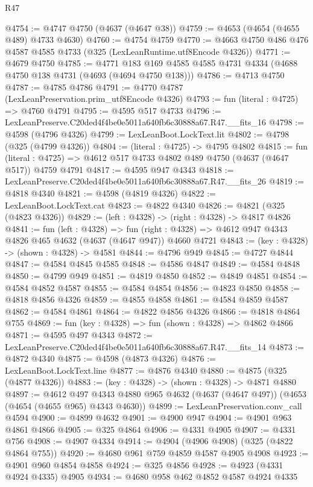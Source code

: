 \begin{lexlean}{R47}
\begin{coremodule}
@4754 := @4747 @4750 (@4637 (@4647 @38))
@4759 := @4653 (@4654 (@4655 @489) @4733 @4630)
@4760 := @4754 @4759
@4770 := @4663 @4750 @486 @476 @4587 @4585 @4733 (@325 (LexLeanRuntime.utf8Encode @4326))
@4771 := @4679 @4750
@4785 := @4771 @183 @169 @4585 @4585 @4731 @4334 (@4688 @4750 @138 @4731 (@4693 (@4694 @4750 @138)))
@4786 := @4713 @4750
@4787 := @4785 @4786
@4791 := @4770 @4787 (LexLeanPreservation.prim_utf8Encode @4326)
@4793 := fun (literal : @4725) => @4760 @4791
@4795 := @4595 @517 @4733
@4796 := LexLeanPreserve.C20ded4f4be0e5011a640fb6c30888a67.R47.__fits_16
@4798 := @4598 (@4796 @4326)
@4799 := LexLeanBoot.LockText.lit
@4802 := @4798 (@325 (@4799 @4326))
@4804 := (literal : @4725) -> @4795 @4802
@4815 := fun (literal : @4725) => @4612 @517 @4733 @4802 @489 @4750 (@4637 (@4647 @517)) @4759 @4791
@4817 := @4595 @947 @4343
@4818 := LexLeanPreserve.C20ded4f4be0e5011a640fb6c30888a67.R47.__fits_26
@4819 := @4818 @4340
@4821 := @4598 (@4819 @4326)
@4822 := LexLeanBoot.LockText.cat
@4823 := @4822 @4340
@4826 := @4821 (@325 (@4823 @4326))
@4829 := (left : @4328) -> (right : @4328) -> @4817 @4826
@4841 := fun (left : @4328) =>
  fun (right : @4328) => @4612 @947 @4343 @4826 @465 @4632 (@4637 (@4647 @947)) @4660 @4721
@4843 := (key : @4328) -> (shown : @4328) -> @4581
@4844 := @4796 @949
@4845 := @4727 @4844
@4847 := @4584 @4845 @4585
@4848 := @4586 @4847
@4849 := @4584 @4848
@4850 := @4799 @949
@4851 := @4819 @4850
@4852 := @4849 @4851
@4854 := @4584 @4852 @4587
@4855 := @4584 @4854
@4856 := @4823 @4850
@4858 := @4818 @4856 @4326
@4859 := @4855 @4858
@4861 := @4584 @4859 @4587
@4862 := @4584 @4861
@4864 := @4822 @4856 @4326
@4866 := @4818 @4864 @755
@4869 := fun (key : @4328) => fun (shown : @4328) => @4862 @4866
@4871 := @4595 @497 @4343
@4872 := LexLeanPreserve.C20ded4f4be0e5011a640fb6c30888a67.R47.__fits_14
@4873 := @4872 @4340
@4875 := @4598 (@4873 @4326)
@4876 := LexLeanBoot.LockText.line
@4877 := @4876 @4340
@4880 := @4875 (@325 (@4877 @4326))
@4883 := (key : @4328) -> (shown : @4328) -> @4871 @4880
@4897 := @4612
    @497
    @4343
    @4880
    @965
    @4632
    (@4637 (@4647 @497))
    (@4653 (@4654 (@4655 @965) @4343 @4630))
@4899 := LexLeanPreservation.conv_call @4594
@4900 := @4899 @4632
@4901 := @4900 @947
@4904 := @4901 @963 @4861 @4866
@4905 := @325 @4864
@4906 := @4331 @4905
@4907 := @4331 @756
@4908 := @4907 @4334
@4914 := @4904 (@4906 @4908) (@325 (@4822 @4864 @755))
@4920 := @4680 @961 @759 @4859 @4587 @4905 @4908
@4923 := @4901 @960 @4854 @4858
@4924 := @325 @4856
@4928 := @4923 (@4331 @4924 @4335) @4905
@4934 := @4680 @958 @462 @4852 @4587 @4924 @4335

\end{coremodule}
\end{lexlean}
